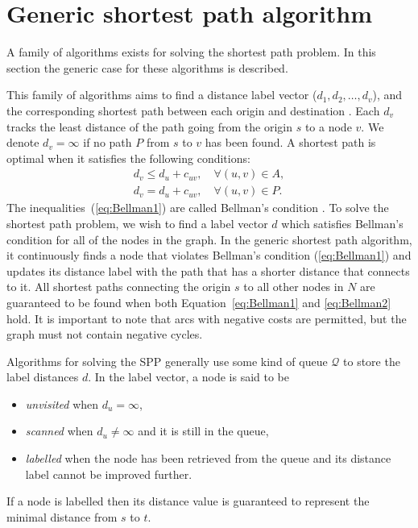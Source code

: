 \section{Generic shortest path algorithm}
A family of algorithms exists for solving the shortest path problem.
In this section the generic case for these algorithms is described.

This family of algorithms aims to find a 
distance label vector ($d_1, d_2,\dots, d_v$),
and the corresponding shortest path between each origin and destination \citep{Klunder}.
Each $d_v$ tracks the least distance of the path going from the origin $s$ to a node $v$.
We denote $d_v = \infty$ if no path $P$ from $s$ to $v$ has been found.
A shortest path is optimal when it satisfies the following conditions:
\begin{align}
    d_v \leq d_u + c_{uv}, \quad \forall(u,v) \in A, \label{eq:Bellman1}\\
    d_v  =   d_u + c_{uv}, \quad \forall(u,v) \in P. \label{eq:Bellman2}
\end{align}
The inequalities~(\ref{eq:Bellman1}) are called Bellman's condition \citep{Bellman}.
To solve the shortest path problem,
we wish to find a label vector $d$ which satisfies Bellman's condition for all of the nodes in the graph.
In the generic shortest path algorithm,
it continuously finds a node that violates Bellman's condition (\ref{eq:Bellman1}) and updates its distance label with the path that has a shorter distance that connects to it.
All shortest paths connecting the origin $s$ to all other nodes in $N$ are guaranteed to be found when both Equation~\eqref{eq:Bellman1} and \eqref{eq:Bellman2} hold.
It is important to note that arcs with negative costs are permitted,
but the graph must not contain negative cycles.

Algorithms for solving the SPP generally use some kind of queue $\mathcal{Q}$ to store the label distances $d$.
In the label vector,
a node is said to be 
\begin{itemize}
    \item \emph{unvisited} when $d_u = \infty$,
    \item \emph{scanned} when $d_u \neq \infty$ and it is still in the queue,
    \item \emph{labelled} when the node has been retrieved from the queue and its distance label cannot be improved further.
\end{itemize}
If a node is labelled then its distance value is guaranteed to represent the minimal distance from $s$ to $t$.

